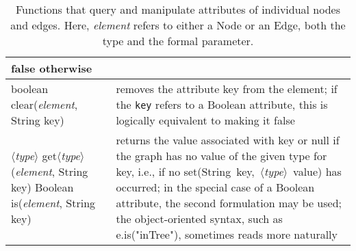 \begin{table}
\begin{tabular}{| m{} | m{} |}
    \textsf{false} otherwise
    \\ \hline
    \textsf{boolean clear(\emph{element}, String key)}
    &
    removes the attribute \textsf{key} from the element; if the \texttt{key} refers to
    a Boolean attribute, this is logically equivalent to making it false
    \\ \hline
    \shortstack[l]{
    \textsf{$\langle$\emph{type}$\rangle$ get$\langle$\emph{type}$\rangle$(\emph{element}, String key)}\\
    \textsf{Boolean is(\emph{element}, String key)}
    }
    &
    returns the value associated with \textsf{key} or \textsf{null}
    if the graph has no value of the given type for \textsf{key}, i.e.,
    if no
    \textsf{set(String~key,~$\langle$\emph{type}$\rangle$~value)} has occurred;
    in the special case of a \textsf{Boolean} attribute, the second formulation
    may be used;
    the object-oriented syntax, such as \textsf{e.is("inTree")}, sometimes
    reads more naturally
    \\ \hline
  \end{tabular}

  \caption{Functions that query and manipulate attributes of individual
    nodes and edges.
    Here, \emph{element} refers to either a \textsf{Node} or an \textsf{Edge},
    both the type and the formal parameter.
  }
  \label{tab:graph_element_functions}
\end{table}
